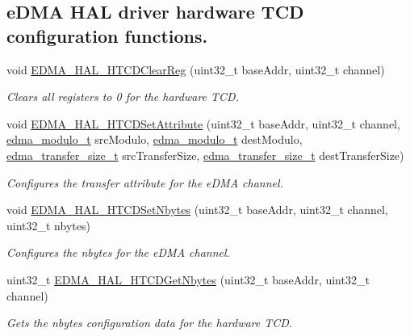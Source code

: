 \subsection*{e\+D\+MA H\+AL driver hardware T\+CD configuration functions.}
\begin{DoxyCompactItemize}
\item 
void \hyperlink{group__edma__hal_ga30ce8853f61da0d0a82b67200d0c75de}{E\+D\+M\+A\+\_\+\+H\+A\+L\+\_\+\+H\+T\+C\+D\+Clear\+Reg} (uint32\+\_\+t base\+Addr, uint32\+\_\+t channel)
\begin{DoxyCompactList}\small\item\em Clears all registers to 0 for the hardware T\+CD. \end{DoxyCompactList}\item 
void \hyperlink{group__edma__hal_ga1c53422c4d0a3bae4a03ae4656123298}{E\+D\+M\+A\+\_\+\+H\+A\+L\+\_\+\+H\+T\+C\+D\+Set\+Attribute} (uint32\+\_\+t base\+Addr, uint32\+\_\+t channel, \hyperlink{group__edma__hal_ga567f4aba444f1fb55ac796ea3c12b1f6}{edma\+\_\+modulo\+\_\+t} src\+Modulo, \hyperlink{group__edma__hal_ga567f4aba444f1fb55ac796ea3c12b1f6}{edma\+\_\+modulo\+\_\+t} dest\+Modulo, \hyperlink{group__edma__hal_ga3cd26ca8831986959f668621f2e52d32}{edma\+\_\+transfer\+\_\+size\+\_\+t} src\+Transfer\+Size, \hyperlink{group__edma__hal_ga3cd26ca8831986959f668621f2e52d32}{edma\+\_\+transfer\+\_\+size\+\_\+t} dest\+Transfer\+Size)
\begin{DoxyCompactList}\small\item\em Configures the transfer attribute for the e\+D\+MA channel. \end{DoxyCompactList}\item 
void \hyperlink{group__edma__hal_ga8e8962fede985363851816b9c9221c8a}{E\+D\+M\+A\+\_\+\+H\+A\+L\+\_\+\+H\+T\+C\+D\+Set\+Nbytes} (uint32\+\_\+t base\+Addr, uint32\+\_\+t channel, uint32\+\_\+t nbytes)
\begin{DoxyCompactList}\small\item\em Configures the nbytes for the e\+D\+MA channel. \end{DoxyCompactList}\item 
uint32\+\_\+t \hyperlink{group__edma__hal_ga19ef0b340d2165a0a7a620f222e51186}{E\+D\+M\+A\+\_\+\+H\+A\+L\+\_\+\+H\+T\+C\+D\+Get\+Nbytes} (uint32\+\_\+t base\+Addr, uint32\+\_\+t channel)
\begin{DoxyCompactList}\small\item\em Gets the nbytes configuration data for the hardware T\+CD. \end{DoxyCompactList}\item 

\end{DoxyCompactItemize}
